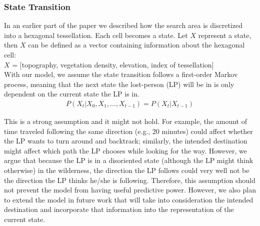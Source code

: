 \subsubsection{State Transition}
\label{sec:3.4.2}

In an earlier part of the paper we described how the search area is discretized into a hexagonal tessellation. Each cell becomes a state. Let $X$ represent a state, then $X$ can be defined as a vector containing information about the hexagonal cell:\\

\indent{}$X$ = [topography, vegetation density, elevation, index of tessellation]\\

With our model, we assume the state transition follows a first-order Markov process, meaning that the next state the lost-person (LP) will be in is only dependent on the current state the LP is in.
\begin{align}
\label{FirstOrder}
P(X_t|X_0, X_1, ..., X_{t-1}) = P(X_t|X_{t-1})
\end{align}

This is a strong assumption and it might not hold. For example, the amount of time traveled following the same direction (e.g., 20 minutes) could affect whether the LP wants to turn around and backtrack; similarly, the intended destination might affect which path the LP chooses while looking for the way. However, we argue that because the LP is in a disoriented state (although the LP might think otherwise) in the wilderness, the direction the LP follows could very well not be the direction the LP thinks he/she is following. Therefore, this assumption should not prevent the model from having useful predictive power. However, we also plan to extend the model in future work that will take into consideration the intended destination and incorporate that information into the representation of the current state.

